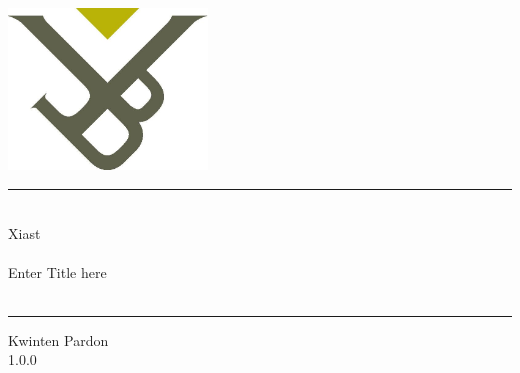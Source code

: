 \documentclass[12pt]{article}
\newcommand{\ProjectName}{Xiast}
\newcommand{\DocumentName}{Enter Title here}
\newcommand{\Title}{\ProjectName \\ \hfill  \\ \DocumentName \\ \hfill}
\newcommand{\Author}{Kwinten Pardon}
\newcommand{\Version}{1.0.0}
\begin{document}
\begin{titlepage}

\begin{minipage}{0.45\textwidth}
\begin{flushleft}

\end{flushleft}

\end{minipage}
\begin{minipage}{0.45\textwidth}

\begin{flushright}

\includegraphics[width=150pt]{img/logoVUB.jpg}

\end{flushright}

\end{minipage}

\begin{center}
\vfill
\hrule 
\hfill \\
{\Huge \Title}
\hfill \\
\hrule
\vfill
\vfill
\end{center}

\begin{minipage}{0.45\textwidth}
\begin{flushleft}
\Author \\
\Version \\
\end{flushleft}
\end{minipage}
\begin{minipage}{0.45\textwidth}
\begin{flushright}

\end{flushright}
\end{minipage}
\end{titlepage}
\end{document}
